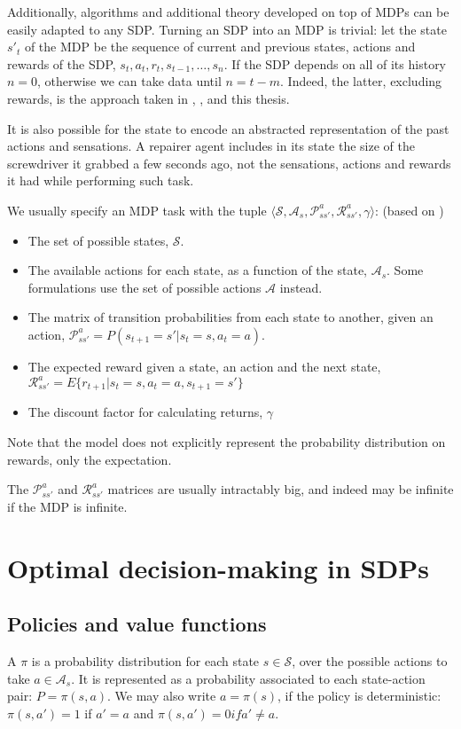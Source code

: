 Additionally, algorithms and additional theory developed on top of \acp{MDP} can
be easily adapted to any \ac{SDP}. Turning an \ac{SDP} into an \ac{MDP} is
trivial: let the state $s'_t$ of the \ac{MDP} be the sequence of current and
previous states, actions and rewards of the SDP, $s_t,a_t,r_t,s_{t-1},\dots,s_n$. If the
\ac{SDP} depends on all of its history $n=0$, otherwise we can take data until
$n=t-m$. Indeed, the latter, excluding rewards, is the approach taken in
\citet{mnih2015human}, \citet{kulkarni2016hierarchical}, and this thesis.

It is also possible for the state to encode an abstracted representation of the
past actions and sensations. A repairer agent includes in its state the size of
the screwdriver it grabbed a few seconds ago, not the sensations, actions and
rewards it had while performing such task.

We usually specify an \ac{MDP} task with the tuple $\langle \mathcal{S}, \mathcal{A}_s,
\mathcal{P}^a_{ss'}, \mathcal{R}^a_{ss'}, \gamma \rangle$:
(based on \citet[Section~3.6]{sutton1998introduction})
\begin{itemize}
\item The set of possible states, $\mathcal{S}$.
\item The available actions for each state, as a function of the state,
  $\mathcal{A}_s$. Some formulations use the set of possible actions
  $\mathcal{A}$ instead.
\item The matrix of transition probabilities from each state to another, given
  an action, $\mathcal{P}^a_{ss'} = P(s_{t+1}=s' | s_t=s, a_t=a)$.
\item The expected reward given a state, an action and the next state,
 $\mathcal{R}^a_{ss'} = E \lbrace r_{t+1} | s_t=s, a_t=a, s_{t+1}=s' \rbrace$
\item The discount factor for calculating returns, $\gamma$
\end{itemize}

Note that the model does not explicitly represent the probability distribution
on rewards, only the expectation.

The $\mathcal{P}^a_{ss'}$ and $\mathcal{R}^a_{ss'}$ matrices are usually
intractably big, and indeed may be infinite if the \ac{MDP} is infinite.

\section{Optimal decision-making in \acp{SDP}}
\subsection{Policies and value functions}
A  $\pi$ is a probability distribution for each state
$s\in\mathcal{S}$, over the possible actions to take $a \in \mathcal{A}_s$. It
is represented as a probability associated to each state-action pair: $P =
\pi(s, a)$. We may also write $a = \pi(s)$, if the policy is deterministic:
$\pi(s, a')=1$ if $a'=a$ and $\pi(s, a')=0 if  a' \neq a$.

